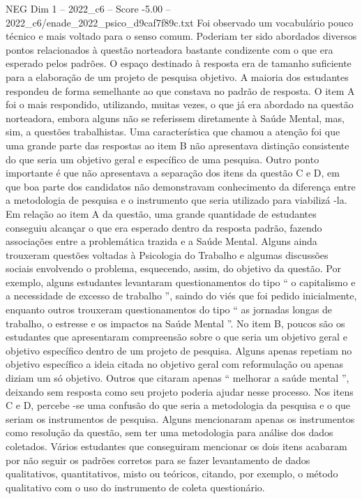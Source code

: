 \begin{textsample}{NEG Dim 1 – 2022\_c6 – Score -5.00 – 2022\_c6/enade\_2022\_psico\_d9caf7f89c.txt}
Foi observado um vocabulário pouco técnico e mais voltado para o senso comum.
Poderiam ter sido abordados diversos pontos relacionados à questão norteadora bastante condizente com o que era esperado pelos padrões.
O espaço destinado à resposta era de tamanho suficiente para a elaboração de um projeto de pesquisa objetivo.
A maioria dos estudantes respondeu de forma semelhante ao que constava no padrão de resposta.
O item A foi o mais respondido, utilizando, muitas vezes, o que já era abordado na questão norteadora, embora alguns não se referissem diretamente à Saúde Mental, mas, sim, a questões trabalhistas.
Uma característica que chamou a atenção foi que uma grande parte das respostas ao item B não apresentava distinção consistente do que seria um objetivo geral e específico de uma pesquisa.
Outro ponto importante é que não apresentava a separação dos itens da questão C e D, em que boa parte dos candidatos não demonstravam conhecimento da diferença entre a metodologia de pesquisa e o instrumento que seria utilizado para viabilizá -la.
Em relação ao item A da questão, uma grande quantidade de estudantes conseguiu alcançar o que era esperado dentro da resposta padrão, fazendo associações entre a problemática trazida e a Saúde Mental.
Alguns ainda trouxeram questões voltadas à Psicologia do Trabalho e algumas discussões sociais envolvendo o problema, esquecendo, assim, do objetivo da questão.
Por exemplo, alguns estudantes levantaram questionamentos do tipo “ o capitalismo e a necessidade de excesso de trabalho ”, saindo do viés que foi pedido inicialmente, enquanto outros trouxeram questionamentos do tipo “ as jornadas longas de trabalho, o estresse e os impactos na Saúde Mental ”.
No item B, poucos são os estudantes que apresentaram compreensão sobre o que seria um objetivo geral e objetivo específico dentro de um projeto de pesquisa.
Alguns apenas repetiam no objetivo específico a ideia citada no objetivo geral com reformulação ou apenas diziam um só objetivo.
Outros que citaram apenas “ melhorar a saúde mental ”, deixando sem resposta como seu projeto poderia ajudar nesse processo.
Nos itens C e D, percebe -se uma confusão do que seria a metodologia da pesquisa e o que seriam os instrumentos de pesquisa.
Alguns mencionaram apenas os instrumentos como resolução da questão, sem ter uma metodologia para análise dos dados coletados.
Vários estudantes que conseguiram mencionar os dois itens acabaram por não seguir os padrões corretos para se fazer levantamento de dados qualitativos, quantitativos, misto ou teóricos, citando, por exemplo, o método qualitativo com o uso do instrumento de coleta questionário.

\end{textsample}
